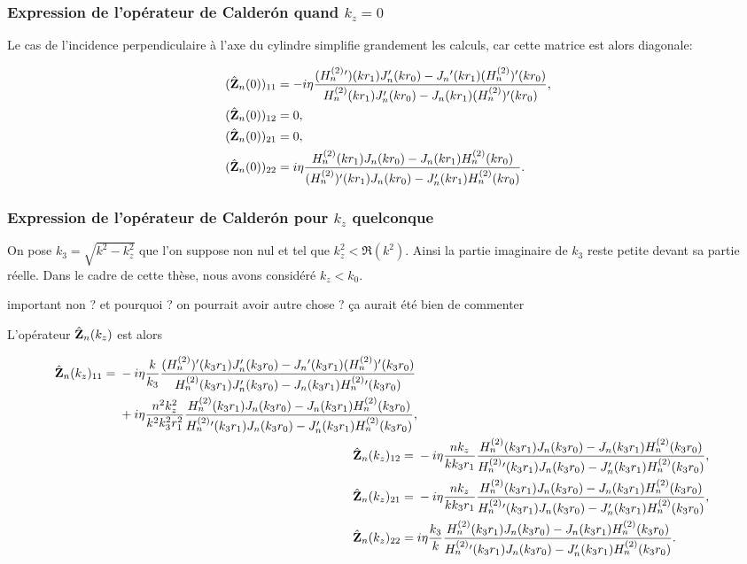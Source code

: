     \subsubsection{Expression de l'opérateur de Calderón quand \(k_z=0\)}
      Le cas de l'incidence perpendiculaire à l'axe du cylindre simplifie grandement les calculs, car cette matrice est alors diagonale:

      \begin{align*}
        (\hat{\mathbf{Z}}_n(0))_{11} &= -i\eta\dfrac{
          (H^{(2)}_n{}')(kr_1)J_n'(kr_0)-J_n{}'(kr_1)(H^{(2)}_n{})'(kr_0)
        }{
          H^{(2)}_n(kr_1)J_n'(kr_0)-J_n(kr_1)(H^{(2)}_n{})'(kr_0)
        },
        \\
        (\hat{\mathbf{Z}}_n(0))_{12} &= 0,
        \\
        (\hat{\mathbf{Z}}_n(0))_{21} &= 0,
        \\
        (\hat{\mathbf{Z}}_n(0))_{22} &=i\eta\dfrac{
            H^{(2)}_n(kr_1)J_n(kr_0)-J_n(kr_1)H^{(2)}_n(kr_0)
          }{
            (H^{(2)}_n{})'(kr_1)J_n(kr_0)-J_n'(kr_1)H^{(2)}_n(kr_0)
          }.
      \end{align*}

    \subsubsection{Expression de l'opérateur de Calderón pour \(k_z\) quelconque}

      On pose \(k_3 = \sqrt{k^2 - k_z^2}\) que l'on suppose non nul et tel que \(k_z^2 < \Re(k^2)\).
      Ainsi la partie imaginaire de \(k_3\) reste petite devant sa partie réelle.
      Dans le cadre de cette thèse, nous avons considéré \(k_z < k_0\).
      \begin{REM}
  important non ? et pourquoi ? on pourrait avoir autre chose ? ça aurait été bien de commenter 
\end{REM}

      L'opérateur \(\hat{\mathbf{Z}}_n(k_z)\) est alors

      \newcommand{\Sni}{\frac{
        (H^{(2)}_n{})'(k_3r_1)J_n'(k_3r_0)-J_n{}'(k_3r_1)(H^{(2)}_n{})'(k_3r_0)
      }{
        H^{(2)}_n(k_3r_1)J_n'(k_3r_0)-J_n(k_3r_1)H^{(2)}_n{}'(k_3r_0)
      }}

      \newcommand{\Tni}{\frac{
        H^{(2)}_n(k_3r_1)J_n(k_3r_0)-J_n(k_3r_1)H^{(2)}_n(k_3r_0)
      }{
        H^{(2)}_n{}'(k_3r_1)J_n(k_3r_0)-J_n'(k_3r_1)H^{(2)}_n(k_3r_0)
      }}

      \begin{align*}
        \begin{split}
          \hat\mZ_n(k_z)_{11} ={}& - i\eta\frac{k}{k_3}\Sni
          \\
          {}& + i\eta\frac{n^2k_z^2}{k^2k_3^2r_1^2}\Tni,
        \end{split}
        \\
        \hat\mZ_n(k_z)_{12} ={}& -i\eta\frac{nk_z}{kk_3r_1}\Tni,
        \\
        \hat\mZ_n(k_z)_{21} ={}& -i\eta\frac{nk_z}{kk_3r_1}\Tni,
        \\
        \hat\mZ_n(k_z)_{22} ={}& i\eta\frac{k_3}{k}\Tni.
      \end{align*}

